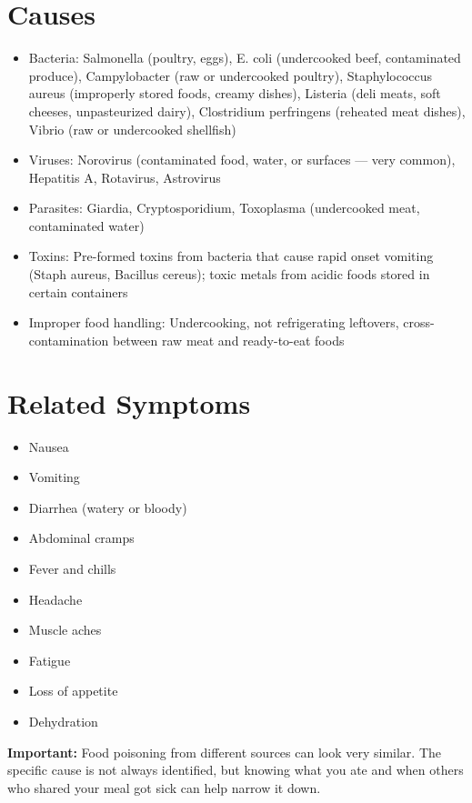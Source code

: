 \section*{Causes}
\begin{itemize}
  \item Bacteria: Salmonella (poultry, eggs), E. coli (undercooked beef, contaminated produce), Campylobacter (raw or undercooked poultry), Staphylococcus aureus (improperly stored foods, creamy dishes), Listeria (deli meats, soft cheeses, unpasteurized dairy), Clostridium perfringens (reheated meat dishes), Vibrio (raw or undercooked shellfish)
  \item Viruses: Norovirus (contaminated food, water, or surfaces — very common), Hepatitis A, Rotavirus, Astrovirus
  \item Parasites: Giardia, Cryptosporidium, Toxoplasma (undercooked meat, contaminated water)
  \item Toxins: Pre-formed toxins from bacteria that cause rapid onset vomiting (Staph aureus, Bacillus cereus); toxic metals from acidic foods stored in certain containers
  \item Improper food handling: Undercooking, not refrigerating leftovers, cross-contamination between raw meat and ready-to-eat foods
\end{itemize}

\section*{Related Symptoms}
\begin{itemize}
  \item Nausea
  \item Vomiting
  \item Diarrhea (watery or bloody)
  \item Abdominal cramps
  \item Fever and chills
  \item Headache
  \item Muscle aches
  \item Fatigue
  \item Loss of appetite
  \item Dehydration
\end{itemize}
\textbf{Important:} Food poisoning from different sources can look very similar. The specific cause is not always identified, but knowing what you ate and when others who shared your meal got sick can help narrow it down.

